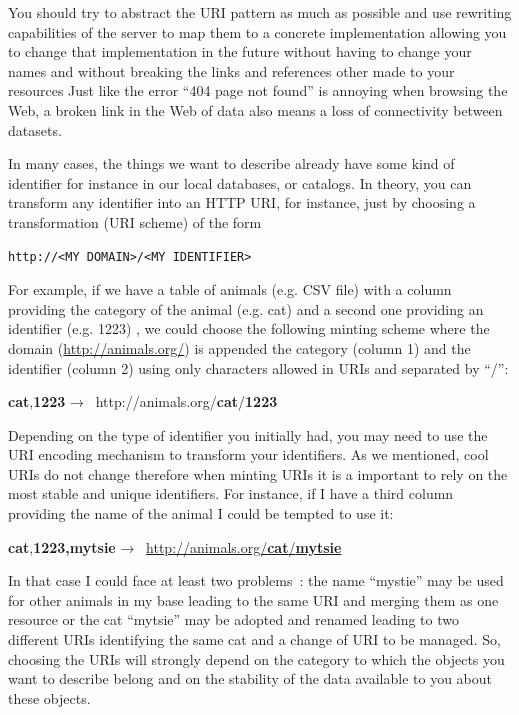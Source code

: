 You should try to abstract the URI pattern as much as possible and use
rewriting capabilities of the server to map them to a concrete
implementation allowing you to change that implementation in the future
without having to change your names and without breaking the links and
references other made to your resources Just like the error ``404 page
not found'' is annoying when browsing the Web, a broken link in the Web
of data also means a loss of connectivity between datasets.

In many cases, the things we want to describe already have some kind of
identifier for instance in our local databases, or catalogs. In theory,
you can transform any identifier into an HTTP URI, for instance, just by
choosing a transformation (URI scheme) of the form

\begin{lstlisting}
http://<MY DOMAIN>/<MY IDENTIFIER>
\end{lstlisting}


For example, if we have a table of animals (e.g. CSV file) with a column
providing the category of the animal (e.g. cat) and a second one
providing an identifier (e.g. 1223) , we could choose the following
minting scheme where the domain (\url{http://animals.org/}) is appended
the category (column 1) and the identifier (column 2) using only
characters allowed in URIs and separated by ``/'':

\textbf{cat},\textbf{1223} →~
http://animals.org/\textbf{cat}/\textbf{1223}

Depending on the type of identifier you initially had, you may need to
use the URI encoding mechanism to transform your identifiers. As we
mentioned, cool URIs do not change therefore when minting URIs it is a
important to rely on the most stable and unique identifiers. For
instance, if I have a third column providing the name of the animal I
could be tempted to use it:

\textbf{cat},\textbf{1223,mytsie} →~
\href{http://animals.org/cat/mytsie}{http://animals.org/\textbf{cat}/\textbf{mytsie}}

In that case I could face at least two problems~: the name ``mystie''
may be used for other animals in my base leading to the same URI and
merging them as one resource or the cat ``mytsie'' may be adopted and
renamed leading to two different URIs identifying the same cat and a
change of URI to be managed. So, choosing the URIs will strongly depend
on the category to which the objects you want to describe belong and on
the stability of the data available to you about these objects.

